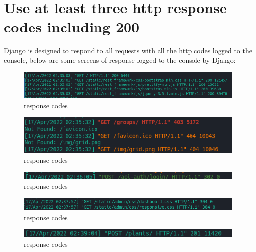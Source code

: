 \documentclass{article}
\begin{document}
  \newpage
    
      
    \section{Use at least three http response codes including 200}
    
    Django is designed to respond to all requests with all the http codes logged to the console, below are some screens of response logged to the console by Django:
    
    \begin{figure}[!htb]
        \centering
        \caption{response codes}
        \includegraphics[scale=0.8]{response1}
    \end{figure}

      \begin{figure}[!htb]
         \centering
         \caption{response codes}
         \includegraphics{response2}
     \end{figure}

     \begin{figure}[!htb]
        \centering
        \caption{response codes}
        \includegraphics{response3}
    \end{figure}

     \begin{figure}[!htb]
        \centering
        \caption{response codes}
        \includegraphics{response4}
    \end{figure}

     \begin{figure}[!htb]
        \centering
        \caption{response codes}
        \includegraphics{response5}
    \end{figure}
    
\end{document}
